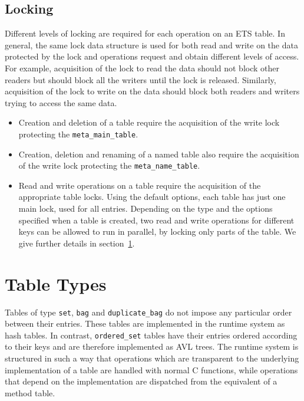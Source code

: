 \documentclass[aps,pre,preprint,nofootinbib]{revtex4}
\begin{document}
\subsection{Locking} \label{sec:tables_locking}

Different levels of locking are required for each operation on an ETS table.
In general, the same lock data structure is used for both read and write on the data protected by the lock and operations request and obtain different levels of access.
For example, acquisition of the lock to read the data should not block other readers but should block all the writers until the lock is released.
Similarly, acquisition of the lock to write on the data should block both readers and writers trying to access the same data.

\begin{itemize}
\item Creation and deletion of a table require the acquisition of the write lock protecting the \verb|meta_main_table|.
\item Creation, deletion and renaming of a named table also require the acquisition of the write lock protecting the \verb|meta_name_table|.
\item Read and write operations on a table require the acquisition of the appropriate table locks.
  Using the default options, each table has just one main lock, used for all entries.
  Depending on the type and the options specified when a table is created, two read and write operations for different keys can be allowed to run in parallel, by locking only parts of the table.
  We give further details in section~\ref{sec:table_types}.
\end{itemize}

\section{Table Types} \label{sec:table_types}

Tables of type \verb|set|, \verb|bag| and \verb|duplicate_bag| do not impose any particular order between their entries.
These tables are implemented in the runtime system as hash tables.
In contrast, \verb|ordered_set| tables have their entries ordered according to their keys and are therefore implemented as AVL trees.
The runtime system is structured in such a way that operations which are transparent to the underlying implementation of a table are handled with normal C functions, while operations that depend on the implementation are dispatched from the equivalent of a method table.
\end{document}
